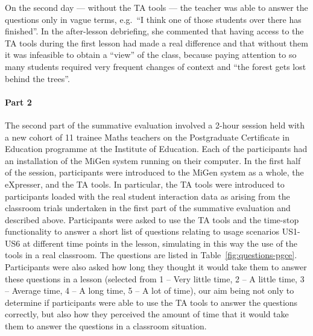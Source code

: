 On the second day --- without the TA tools --- the teacher was able to
answer the questions only in vague terms, e.g.~``I think one of
those students over there has finished''. In the after-lesson debriefing,
she commented that having access to the TA tools during the first lesson 
had made a real difference and that without them it was infeasible to 
obtain a ``view'' of the class, because
paying attention to so many students required very frequent changes of
context and ``the forest gets lost behind the trees''. 

\paragraph{Part 2}
\label{sec:part-2}

The second part of the summative evaluation involved a 2-hour session
held with a new cohort of 11 trainee Maths teachers on the
Postgraduate Certificate in Education programme at the Institute of Education. 
Each of the participants had an installation of the MiGen system running on
their computer. In the first half of the session, participants were
introduced to the MiGen system as a whole, the
eXpresser, and the TA tools. In particular, the TA tools were
introduced to participants loaded with the real student interaction
data as arising from the classroom trials undertaken in the first part
of the summative evaluation and described above. Participants were
asked to use the TA tools and the time-stop functionality to
answer a short list of questions relating to usage scenarios US1-US6
at different time points in the lesson, simulating in this
way the use of the tools in a real classroom.
The questions are listed in Table~\ref{fig:questions-pgce}. 
Participants were also asked how long they thought it would take them to
answer these questions in a lesson
(selected from 1 -- Very little time,
2 -- A little time,
3 -- Average time, 
4 -- A long time, 
5 -- A lot of time),
our aim being not only to
determine if participants were able to use the TA tools to answer the
questions correctly, but also how they perceived the amount of time that it
would take them to answer the questions in a classroom situation. 

